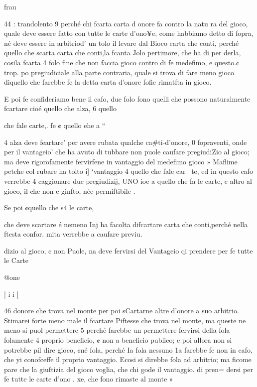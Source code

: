 \documentclass[12pt,a6paper]{article}
\begin{document}
frau
 
 

 

 

 

 

 

44 :
trandolento 9 perché chi fcarta
carta d onore fa contro la natu
ra del gioco, quale deve essere
fatto con tutte le carte d’ono¥e, come habbiamo detto di fopra, né deve essere in arbitriod’
un tolo il levare dal Bioco carta
che conti, perché quello che
scarta carta che conti,la fcanta
Jolo pertimore, che ha di per
derla, cosila fcarta 4 folo fine
che non faccia gioco contro di
fe medefimo, e questo.¢ trop.
po pregiudiciale alla parte contraria, quale si trova di fare meno gioco diquello che farebbe
fe la detta carta d’onore fofie
rimatfta in gioco.

E poi fe confideriamo bene
il cafo, due folo fono quelli che
possono naturalmente fcartare
cioé quello che alza, 6 quello

che fale carte,. fe ¢ quello ehe
a “
 

4
alza deve feartare’ per avere
rubata qualche ca#ti-d’onore,
0 fopraventi, onde per il vantageio’ che ha avuto di tubbare non puole caufare pregiudiZio al gioco; ma deve rigorofamente fervirfene in vantaggio
del medefimo gioco » Maflime
petche col rubare ha tolto i]
‘vantaggio 4 quello che fale car~
te, ed in questo cafo verrebbe
4 caggionare due pregiudizij,
UNO ioe a quello che fa le carte, e altro al gioco, il che non
e ginfto, née permiftibile .

Se poi ¢quello che s4 le carte,

che deve scartare é nemeno Inj
ha facolta difcartare carta che
conti,perché nella ftesta confor.
mita verrebbe a caufare previu.

dizio al gioco, ¢ non Puole, na
deve fervirsi del Vantageio qi
prendere per fe tutte le Carte

@one~

 
 

 

 

 

|
i
i
|

46
donore che trova nel monte
per poi sCartarne altre d’onore
a suo arbitrio. Stimarei forte
meno male il fcartare Piftesse
che trova nel monte, ma queste
ne meno si puol permettere 5
perché farebbe un permettere
fervirsi della fola folamente 4
proprio beneficio, ¢ non a beneficio publico; e poi allora non
si potrebbe pil dire gioco, ¢né
fola, perché Ia fola nessuno 1a
farebbe fe non in cafo, che yi
conofceffe il proprio vantaggio. Ecosi si direbbe fola ad
arbitrio; ma ficome pare che la
giuftizia del gioco voglia, che
chi gode il vantaggio. di pren=
dersi per fe tutte le carte d’ono
. xe, che fono rimaste al monte »
\end{document}
